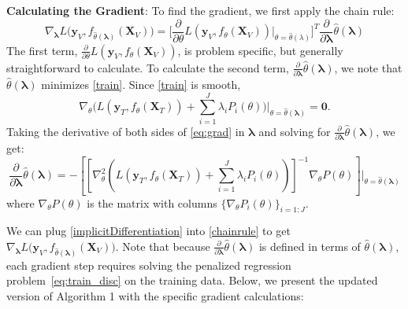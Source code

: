 \documentclass[10pt,letterpaper]{article}
\newcommand*{\vertbar}{\rule[-1ex]{0.5pt}{2.5ex}}
\begin{document}
\noindent
\textbf{Calculating the Gradient}:
To find the gradient, we first apply the chain rule:
\begin{equation}
\nabla_{\boldsymbol{\lambda}} L \Big( \boldsymbol{y}_V, f_{\hat{\theta}(\boldsymbol{\lambda})}(\boldsymbol{X}_V) \Big ) = 
\Big [\frac{\partial}{\partial \theta} L ( \boldsymbol{y}_V, f_{\theta}(\boldsymbol{X}_V)) \Big |_{\theta=\hat{\theta}(\lambda)} \Big ]^T 
\frac{\partial}{\partial \boldsymbol{\lambda}} \hat{\theta}(\boldsymbol{\lambda})
\label{chainrule}
\end{equation}
The first term, $\frac{\partial}{\partial \theta} L ( \boldsymbol{y}_V, f_{\theta}(\boldsymbol{X}_V))$, is problem specific, but generally straightforward to calculate. To calculate the second term, $\frac{\partial}{\partial \boldsymbol{\lambda}} \hat{\theta}(\boldsymbol{\lambda})$, we note that $\hat{\theta}(\boldsymbol{\lambda})$ minimizes \eqref{train}. Since \eqref{train} is smooth,
\begin{equation}
\nabla_\theta \Big ( L(\boldsymbol{y}_T, f_\theta (\boldsymbol{X}_T)) + \sum\limits_{i=1}^J \lambda_i P_i(\theta) \Big ) \Big |_{\theta = \hat \theta(\boldsymbol{\lambda})} = \boldsymbol{0}.
\label{eq:grad}
\end{equation}
Taking the derivative of both sides of \eqref{eq:grad} in $\boldsymbol{\lambda}$ and solving for $\frac{\partial}{\partial \boldsymbol{\lambda}} \hat{\theta}(\boldsymbol{\lambda})$, we get:
\begin{equation}
\frac{\partial}{\partial \boldsymbol{\lambda}} \hat{\theta}(\boldsymbol{\lambda}) = 
- \left [ \left [
 \nabla_\theta^2 \left (  L(\boldsymbol{y}_T, f_\theta (\boldsymbol{X}_T))  +  \sum\limits_{i=1}^J \lambda_i P_i(\theta)  \right )  \right ]^{-1}
\nabla_\theta P(\theta)
\right ]
\bigg |_{\theta = \hat \theta(\boldsymbol{\lambda})}
\label{implicitDifferentiation}
\end{equation}
where $\nabla_\theta P(\theta)$ is the matrix with columns $\{\nabla_\theta P_i(\theta)\}_{i=1:J}$.

We can plug \eqref{implicitDifferentiation} into \eqref{chainrule} to get $\nabla_{\boldsymbol{\lambda}} L \Big( \boldsymbol{y}_V, f_{\hat{\theta}(\boldsymbol{\lambda})}(\boldsymbol{X}_V) \Big )$. Note that because $\frac{\partial}{\partial \boldsymbol{\lambda}} \hat{\theta}(\boldsymbol{\lambda})$ is defined in terms of $\hat{\theta}\left(\boldsymbol{\lambda}\right)$, each gradient step requires solving the penalized regression problem~\eqref{eq:train_disc} on the training data. Below, we present the updated version of Algorithm 1 with the specific gradient calculations:
\end{document}
